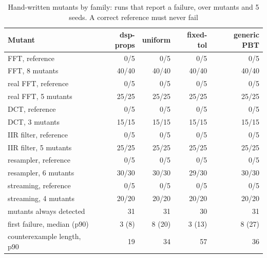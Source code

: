 \begin{table}[t]
\caption{Hand-written mutants by family: runs that report a failure, over mutants and 5 seeds. A correct reference must never fail}
\label{tab:hand}
\centering\scriptsize
\begin{tabular}{@{}lrrrr@{}}
\toprule
Mutant & dsp-props & uniform & fixed-tol & generic PBT \\
\midrule
FFT, reference & 0/5 & 0/5 & 0/5 & 0/5 \\
FFT, 8 mutants & 40/40 & 40/40 & 40/40 & 40/40 \\
real FFT, reference & 0/5 & 0/5 & 0/5 & 0/5 \\
real FFT, 5 mutants & 25/25 & 25/25 & 25/25 & 25/25 \\
DCT, reference & 0/5 & 0/5 & 0/5 & 0/5 \\
DCT, 3 mutants & 15/15 & 15/15 & 15/15 & 15/15 \\
IIR filter, reference & 0/5 & 0/5 & 0/5 & 0/5 \\
IIR filter, 5 mutants & 25/25 & 25/25 & 25/25 & 25/25 \\
resampler, reference & 0/5 & 0/5 & 0/5 & 0/5 \\
resampler, 6 mutants & 30/30 & 30/30 & 29/30 & 30/30 \\
streaming, reference & 0/5 & 0/5 & 0/5 & 0/5 \\
streaming, 4 mutants & 20/20 & 20/20 & 20/20 & 20/20 \\
\midrule
mutants always detected & 31 & 31 & 30 & 31 \\
first failure, median (p90) & 3 (8) & 8 (20) & 3 (13) & 8 (27) \\
counterexample length, p90 & 19 & 34 & 57 & 36 \\
\bottomrule
\end{tabular}
\end{table}
